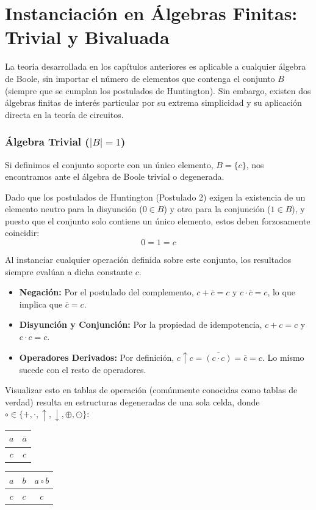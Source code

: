 \chapter[Álgebras Finitas: Trivial y Bivaluada]{Instanciación en Álgebras Finitas: Trivial y Bivaluada}

La teoría desarrollada en los capítulos anteriores es aplicable a cualquier álgebra de Boole, sin importar el número de elementos que contenga el conjunto $B$ (siempre que se cumplan los postulados de Huntington). Sin embargo, existen dos álgebras finitas de interés particular por su extrema simplicidad y su aplicación directa en la teoría de circuitos.

\subsection{Álgebra Trivial ($|B| = 1$)}
Si definimos el conjunto soporte con un único elemento, $B = \{ c \}$, nos encontramos ante el álgebra de Boole trivial o degenerada. 

Dado que los postulados de Huntington (Postulado 2) exigen la existencia de un elemento neutro para la disyunción ($0 \in B$) y otro para la conjunción ($1 \in B$), y puesto que el conjunto solo contiene un único elemento, estos deben forzosamente coincidir:
\[ 0 = 1 = c \]

Al instanciar cualquier operación definida sobre este conjunto, los resultados siempre evalúan a dicha constante $c$. 
\begin{itemize}
    \item \textbf{Negación:} Por el postulado del complemento, $c + \overline{c} = c$ y $c \cdot \overline{c} = c$, lo que implica que $\overline{c} = c$.
    \item \textbf{Disyunción y Conjunción:} Por la propiedad de idempotencia, $c + c = c$ y $c \cdot c = c$.
    \item \textbf{Operadores Derivados:} Por definición, $c \uparrow c = \overline{(c \cdot c)} = \overline{c} = c$. Lo mismo sucede con el resto de operadores.
\end{itemize}

Visualizar esto en tablas de operación (comúnmente conocidas como tablas de verdad) resulta en estructuras degeneradas de una sola celda, donde $\circ \in \{ +, \cdot, \uparrow, \downarrow, \oplus, \odot \}$:

\begin{center}
\begin{tabular}{c|c}
$a$ & $\overline{a}$ \\
\hline
$c$ & $c$
\end{tabular}
\qquad
\begin{tabular}{cc|c}
$a$ & $b$ & $a \circ b$ \\
\hline
$c$ & $c$ & $c$
\end{tabular}
\end{center}

